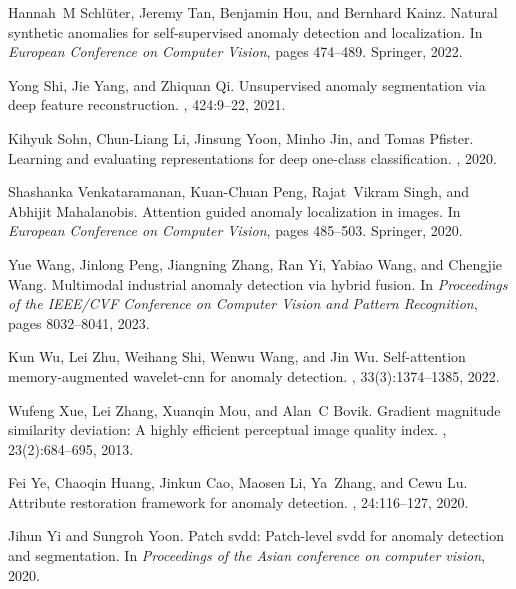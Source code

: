 \documentclass[5p, twocolumn]{elsarticle}[draft]
\begin{document}
\begin{thebibliography}{10}
Hannah~M Schl{\"u}ter, Jeremy Tan, Benjamin Hou, and Bernhard Kainz.
\newblock Natural synthetic anomalies for self-supervised anomaly detection and localization.
\newblock In {\em European Conference on Computer Vision}, pages 474--489. Springer, 2022.

Yong Shi, Jie Yang, and Zhiquan Qi.
\newblock Unsupervised anomaly segmentation via deep feature reconstruction.
, 424:9--22, 2021.

Kihyuk Sohn, Chun-Liang Li, Jinsung Yoon, Minho Jin, and Tomas Pfister.
\newblock Learning and evaluating representations for deep one-class classification.
, 2020.

Shashanka Venkataramanan, Kuan-Chuan Peng, Rajat~Vikram Singh, and Abhijit Mahalanobis.
\newblock Attention guided anomaly localization in images.
\newblock In {\em European Conference on Computer Vision}, pages 485--503. Springer, 2020.

Yue Wang, Jinlong Peng, Jiangning Zhang, Ran Yi, Yabiao Wang, and Chengjie Wang.
\newblock Multimodal industrial anomaly detection via hybrid fusion.
\newblock In {\em Proceedings of the IEEE/CVF Conference on Computer Vision and Pattern Recognition}, pages 8032--8041, 2023.

Kun Wu, Lei Zhu, Weihang Shi, Wenwu Wang, and Jin Wu.
\newblock Self-attention memory-augmented wavelet-cnn for anomaly detection.
, 33(3):1374--1385, 2022.

Wufeng Xue, Lei Zhang, Xuanqin Mou, and Alan~C Bovik.
\newblock Gradient magnitude similarity deviation: A highly efficient perceptual image quality index.
, 23(2):684--695, 2013.

Fei Ye, Chaoqin Huang, Jinkun Cao, Maosen Li, Ya~Zhang, and Cewu Lu.
\newblock Attribute restoration framework for anomaly detection.
, 24:116--127, 2020.

Jihun Yi and Sungroh Yoon.
\newblock Patch svdd: Patch-level svdd for anomaly detection and segmentation.
\newblock In {\em Proceedings of the Asian conference on computer vision}, 2020.


\end{thebibliography}
\end{document}
